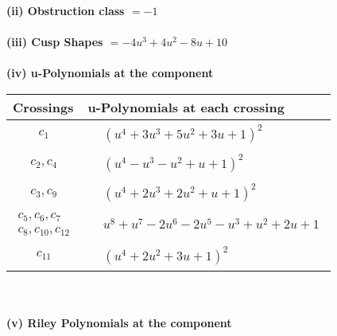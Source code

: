\documentclass[1p]{elsarticle_modified}
\theoremstyle{definition}
\begin{document}
\flushleft \textbf{(ii) Obstruction class $= -1$}\\~\\
\flushleft \textbf{(iii) Cusp Shapes $= -4 u^3+4 u^2-8 u+10$}\\~\\
\newpage\renewcommand{\arraystretch}{1}
\flushleft \textbf{(iv) u-Polynomials at the component}\newline \\
\begin{tabular}{m{50pt}|m{274pt}}
Crossings & \hspace{64pt}u-Polynomials at each crossing \\
\hline $$\begin{aligned}c_{1}\end{aligned}$$&$\begin{aligned}
&(u^4+3 u^3+5 u^2+3 u+1)^2
\end{aligned}$\\
\hline $$\begin{aligned}c_{2},c_{4}\end{aligned}$$&$\begin{aligned}
&(u^4- u^3- u^2+u+1)^2
\end{aligned}$\\
\hline $$\begin{aligned}c_{3},c_{9}\end{aligned}$$&$\begin{aligned}
&(u^4+2 u^3+2 u^2+u+1)^2
\end{aligned}$\\
\hline $$\begin{aligned}c_{5},c_{6},c_{7}\\c_{8},c_{10},c_{12}\end{aligned}$$&$\begin{aligned}
&u^8+u^7-2 u^6-2 u^5- u^3+u^2+2 u+1
\end{aligned}$\\
\hline $$\begin{aligned}c_{11}\end{aligned}$$&$\begin{aligned}
&(u^4+2 u^2+3 u+1)^2
\end{aligned}$\\
\hline
\end{tabular}\\~\\
\newpage\renewcommand{\arraystretch}{1}
\flushleft \textbf{(v) Riley Polynomials at the component}\newline \\
\end{document}
